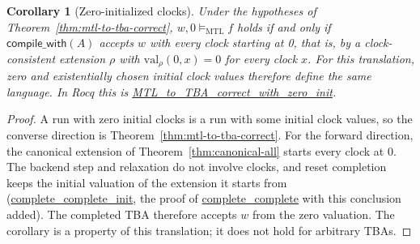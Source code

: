 \documentclass{ieeeaccess}
\newtheorem{corollary}[theorem]{Corollary}
\newcommand{\satM}{\models_{\mathrm{MTL}}}
\newcommand{\Rocqid}[1]{\url{#1}}
\begin{document}
\begin{corollary}[Zero-initialized clocks]
\label{cor:zero-init}
Under the hypotheses of Theorem~\ref{thm:mtl-to-tba-correct}, $w,0\satM f$
holds if and only if $\mathsf{compile\_with}(A)$ accepts $w$ with every clock
starting at 0, that is, by a clock-consistent extension $\rho$ with
$\mathrm{val}_\rho(0,x)=0$ for every clock $x$. For this translation, zero and
existentially chosen initial clock values therefore define the same language.
In Rocq this is \Rocqid{MTL_to_TBA_correct_with_zero_init}.
\end{corollary}
\begin{proof}
A run with zero initial clocks is a run with some initial clock values, so the
converse direction is Theorem~\ref{thm:mtl-to-tba-correct}. For the forward
direction, the canonical extension of Theorem~\ref{thm:canonical-all} starts
every clock at 0. The backend step and relaxation do not involve clocks, and
reset completion keeps the initial valuation of the extension it starts from
(\Rocqid{complete_complete_init}, the proof of \Rocqid{complete_complete} with
this conclusion added). The completed TBA therefore accepts $w$ from the zero
valuation. The corollary is a property of this translation; it does not hold
for arbitrary TBAs.
\end{proof}
\end{document}
